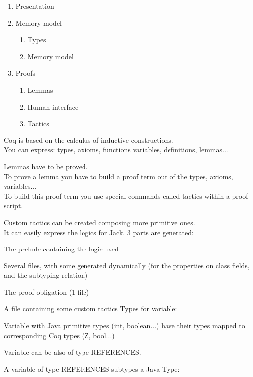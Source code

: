 \begin{enumerate}
\item Presentation
\item Memory model
\begin{enumerate} \small
\item Types
\item Memory model
\end{enumerate}
\item Proofs
\begin{enumerate} \small
\item Lemmas
\item Human interface
\item Tactics
\end{enumerate}
\end{enumerate}
\small
Coq is based on the {\purple calculus of inductive constructions}.\\
You can express: types, axioms, functions
variables, definitions, {\purple lemmas}...

Lemmas have to be proved.\\
To prove a lemma you have to build a {\purple proof term} out of the types, 
axioms, variables... \\
To build this proof term you use special commands 
called {\purple tactics} within a proof script.

{\purple Custom tactics} can be created composing more primitive ones.\\

It can easily express the logics for Jack.
3 parts are generated:
\blist 
\item The {\purple prelude} containing the logic used 
\blist \small
\item Several files, with some generated dynamically
 (for the properties on class fields, and the subtyping relation)
\elist
\item The {\purple proof obligation} (1 file)
\item A file containing some {\purple custom tactics}
\elist
{}\small
Types for variable:
\blist
\item Variable with Java {\purple primitive types} (int,  boolean...) 
have their types  mapped to corresponding {\purple Coq types} (Z, bool...)
\item Variable can be also of type {\purple REFERENCES}.
\elist

A variable of type REFERENCES subtypes a Java Type:

